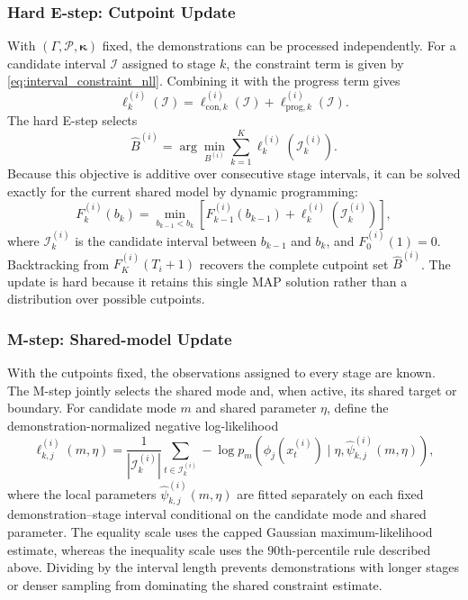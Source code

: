 \subsubsection{Hard E-step: Cutpoint Update}

With $(\Gamma,\mathcal{P},\boldsymbol{\kappa})$ fixed, the demonstrations can be processed independently. For a candidate interval $\mathcal{I}$ assigned to stage $k$, the constraint term is given by \eqref{eq:interval_constraint_nll}. Combining it with the progress term gives
\begin{equation}
\ell_k^{(i)}(\mathcal{I})
=
\ell_{\mathrm{con},k}^{(i)}(\mathcal{I})
+
\ell_{\mathrm{prog},k}^{(i)}(\mathcal{I}).
\label{eq:stage_interval_nll}
\end{equation}
The hard E-step selects
\begin{equation}
\hat B^{(i)}
=
\arg\min_{B^{(i)}}
\sum_{k=1}^{K}
\ell_k^{(i)}(\mathcal{I}_k^{(i)}).
\label{eq:hard_e_cutpoint_update}
\end{equation}
Because this objective is additive over consecutive stage intervals, it can be solved exactly for the current shared model by dynamic programming:
\begin{equation}
F_k^{(i)}(b_k)
=
\min_{b_{k-1}<b_k}
\left[
F_{k-1}^{(i)}(b_{k-1})
+
\ell_k^{(i)}(\mathcal{I}_k^{(i)})
\right],
\label{eq:dp_recurrence}
\end{equation}
where $\mathcal{I}_k^{(i)}$ is the candidate interval between $b_{k-1}$ and $b_k$, and $F_0^{(i)}(1)=0$. Backtracking from $F_K^{(i)}(T_i+1)$ recovers the complete cutpoint set $\hat B^{(i)}$. The update is hard because it retains this single MAP solution rather than a distribution over possible cutpoints.

\subsubsection{M-step: Shared-model Update}

With the cutpoints fixed, the observations assigned to every stage are known. The M-step jointly selects the shared mode and, when active, its shared target or boundary. For candidate mode $m$ and shared parameter $\eta$, define the demonstration-normalized negative log-likelihood
\begin{equation}
\ell_{k,j}^{(i)}(m,\eta)
=
\frac{1}{|\mathcal{I}_k^{(i)}|}
\sum_{t\in\mathcal{I}_k^{(i)}}
-\log p_m
\!\left(
\phi_j(x_t^{(i)})
\mid\eta,
\hat\psi_{k,j}^{(i)}(m,\eta)
\right),
\label{eq:demo_normalized_mode_nll}
\end{equation}
where the local parameters $\hat\psi_{k,j}^{(i)}(m,\eta)$ are fitted separately on each fixed demonstration--stage interval conditional on the candidate mode and shared parameter. The equality scale uses the capped Gaussian maximum-likelihood estimate, whereas the inequality scale uses the $90$th-percentile rule described above. Dividing by the interval length prevents demonstrations with longer stages or denser sampling from dominating the shared constraint estimate.

